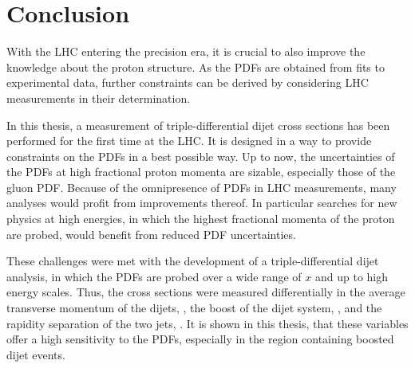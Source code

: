 
\chapter{Conclusion}

With the LHC entering the precision era, it is crucial to also improve the
knowledge about the proton structure. As the PDFs are obtained from fits to
experimental data, further constraints can be derived by considering LHC
measurements in their determination.

In this thesis, a measurement of triple-differential dijet cross sections has
been performed for the first time at the LHC. It is designed in a
way to provide constraints on the PDFs in a best possible way. Up to now, the
uncertainties of the PDFs at high fractional proton momenta are sizable,
especially those of the gluon PDF. Because of the omnipresence of
PDFs in LHC measurements, many analyses would profit from improvements thereof.
In particular searches for new physics at high energies, in which the highest
fractional momenta of the proton are probed, would benefit from reduced PDF
uncertainties.

These challenges were met with the development of a triple-differential dijet
analysis, in which the PDFs are probed over a wide range of $x$ and up to high
energy scales. Thus, the cross sections were measured differentially in the
average transverse momentum of the dijets, \ptavg, the boost of the dijet
system, \yboost, and the rapidity separation of the two jets, \ystar. It is
shown in this thesis, that these variables offer a high sensitivity to the PDFs,
especially in the region containing boosted dijet events.

